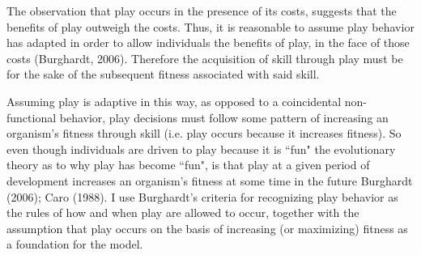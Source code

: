\documentclass[12pt,letterpaper]{article}
\begin{document}
The observation that play occurs in the presence of its costs, suggests that the benefits of play outweigh the costs.
Thus, it is reasonable to assume play behavior has adapted in order to allow individuals the benefits of play, in the face of those costs (Burghardt, 2006).  
Therefore the acquisition of skill through play must be for the sake of the subsequent fitness associated with said skill. 

Assuming play is  adaptive in this way, as opposed to a coincidental non-functional behavior, play decisions must follow some pattern of increasing an organism's fitness through skill (i.e. play occurs because it increases fitness). %
So even though individuals are driven to play because it is ``fun" the evolutionary theory as to why play has become ``fun", is that play at a given period of development increases an organism's fitness at some time in the future Burghardt (2006); Caro (1988). 
I use Burghardt's criteria for recognizing play behavior as the rules of how and when play are allowed to occur, together with the assumption that play occurs on the basis of increasing (or maximizing) fitness as a foundation for the model.



\end{document}
